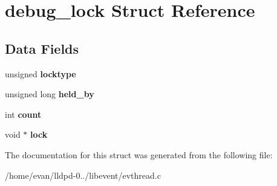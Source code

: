 \section{debug\-\_\-lock \-Struct \-Reference}
\label{structdebug__lock}
\subsection*{\-Data \-Fields}
\begin{DoxyCompactItemize}
\item 
unsigned {\bfseries locktype}\label{structdebug__lock_a0b78485ff43a83c4447ff1cad91aad94}

\item 
unsigned long {\bfseries held\-\_\-by}\label{structdebug__lock_aaf3f06967a4cfefcfbc2e5833081ae6e}

\item 
int {\bfseries count}\label{structdebug__lock_ad43c3812e6d13e0518d9f8b8f463ffcf}

\item 
void $\ast$ {\bfseries lock}\label{structdebug__lock_a100fdaedb8eb0d56fd262e7ea2930930}

\end{DoxyCompactItemize}


\-The documentation for this struct was generated from the following file\-:\begin{DoxyCompactItemize}
\item 
/home/evan/lldpd-\/0../libevent/evthread.\-c\end{DoxyCompactItemize}
